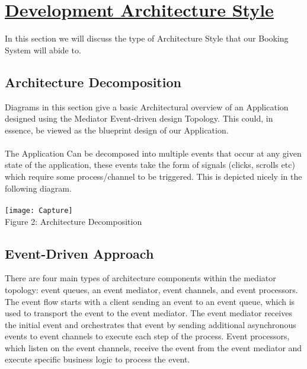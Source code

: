 \documentclass{article}
\begin{document}
\section{\underline{Development Architecture Style}}
In this section we will discuss the type of Architecture Style that our Booking System will abide to.\\
\subsection{Architecture Decomposition}
Diagrams in this section give a basic Architectural overview of an Application designed using the Mediator Event-driven design Topology. This could, in essence, be viewed as the blueprint design of our Application.\\\\ The Application Can be decomposed into multiple events that occur at any given state of the application, these events take the form of signals (clicks, scrolls etc) which require some process/channel to be triggered. This is depicted nicely in the following diagram.\\\\


\texttt{[image: Capture]}\\
Figure 2: Architecture Decomposition

\subsection{Event-Driven Approach}
There are four main types of architecture components within the
mediator topology: event queues, an event mediator, event channels,
and event processors. The event flow starts with a client sending an
event to an event queue, which is used to transport the event to the
event mediator. The event mediator receives the initial event and
orchestrates that event by sending additional asynchronous events
to event channels to execute each step of the process. Event processors,
which listen on the event channels, receive the event from the
event mediator and execute specific business logic to process the
event.\\
\end{document}
